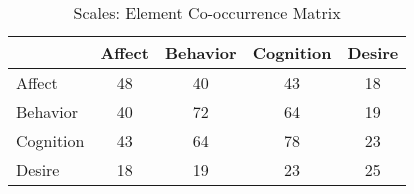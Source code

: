 \begin{table}
\begin{minipage}[t][\textheight][t]{\textwidth}

\caption{\label{tab:ScaleElementCooccurrences}Scales: Element Co-occurrence Matrix}
\begin{tabular}[t]{lcccc}
\toprule
  & Affect & Behavior & Cognition & Desire\\
\midrule
Affect & 48 & 40 & 43 & 18\\
Behavior & 40 & 72 & 64 & 19\\
Cognition & 43 & 64 & 78 & 23\\
Desire & 18 & 19 & 23 & 25\\
\bottomrule
\end{tabular}
\end{minipage}
\end{table}
